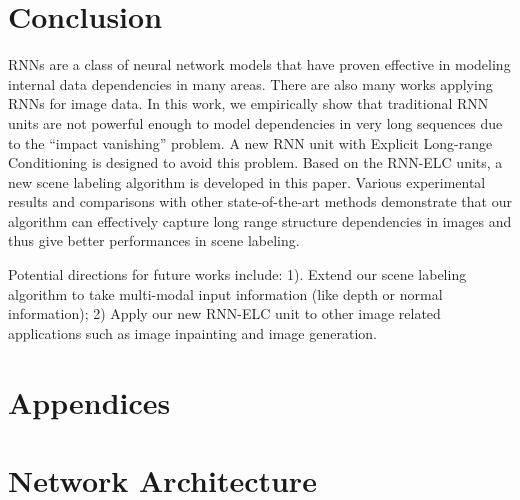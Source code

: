 \documentclass[10pt,twocolumn,letterpaper]{article}
\begin{document}
\section{Conclusion}
RNNs are a class of neural network models that have proven effective in modeling internal data dependencies in many areas. There are also many works applying RNNs for image data. In this work, we empirically show that traditional RNN units are not powerful enough to model dependencies in very long sequences due to the ``impact vanishing'' problem. A new RNN unit with Explicit Long-range Conditioning is designed to avoid this problem. Based on the RNN-ELC units, a new scene labeling algorithm is developed in this paper. Various experimental results and comparisons with other state-of-the-art methods demonstrate that our algorithm can effectively capture long range structure dependencies in images and thus give better performances in scene labeling.

Potential directions for future works include: 1). Extend our scene labeling algorithm to take multi-modal input information (like depth or normal information); 2) Apply our new RNN-ELC unit to other image related applications such as image inpainting and image generation.



\appendix
{}
\section*{Appendices}
\section{Network Architecture}
\end{document}
